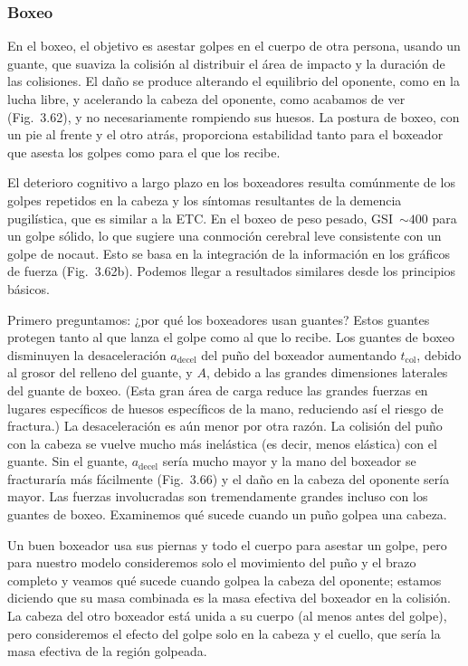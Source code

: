 \documentclass[12pt]{book}
\begin{document}
\subsubsection*{Boxeo}

En el boxeo, el objetivo es asestar golpes en el cuerpo de otra persona, usando un guante, que suaviza la colisión al distribuir el área de impacto y la duración de las colisiones. El daño se produce alterando el equilibrio del oponente, como en la lucha libre, y acelerando la cabeza del oponente, como acabamos de ver (Fig.~3.62), y no necesariamente rompiendo sus huesos. La postura de boxeo, con un pie al frente y el otro atrás, proporciona estabilidad tanto para el boxeador que asesta los golpes como para el que los recibe.

El deterioro cognitivo a largo plazo en los boxeadores resulta comúnmente de los golpes repetidos en la cabeza y los síntomas resultantes de la demencia pugilística, que es similar a la ETC. En el boxeo de peso pesado, GSI~$\sim 400$ para un golpe sólido, lo que sugiere una conmoción cerebral leve consistente con un golpe de nocaut. Esto se basa en la integración de la información en los gráficos de fuerza (Fig.~3.62b). Podemos llegar a resultados similares desde los principios básicos.

Primero preguntamos: ¿por qué los boxeadores usan guantes? Estos guantes protegen tanto al que lanza el golpe como al que lo recibe. Los guantes de boxeo disminuyen la desaceleración $a_{\text{decel}}$ del puño del boxeador aumentando $t_{\text{col}}$, debido al grosor del relleno del guante, y $A$, debido a las grandes dimensiones laterales del guante de boxeo. (Esta gran área de carga reduce las grandes fuerzas en lugares específicos de huesos específicos de la mano, reduciendo así el riesgo de fractura.) La desaceleración es aún menor por otra razón. La colisión del puño con la cabeza se vuelve mucho más inelástica (es decir, menos elástica) con el guante. Sin el guante, $a_{\text{decel}}$ sería mucho mayor y la mano del boxeador se fracturaría más fácilmente (Fig.~3.66) y el daño en la cabeza del oponente sería mayor. Las fuerzas involucradas son tremendamente grandes incluso con los guantes de boxeo. Examinemos qué sucede cuando un puño golpea una cabeza.

Un buen boxeador usa sus piernas y todo el cuerpo para asestar un golpe, pero para nuestro modelo consideremos solo el movimiento del puño y el brazo completo y veamos qué sucede cuando golpea la cabeza del oponente; estamos diciendo que su masa combinada es la masa efectiva del boxeador en la colisión. La cabeza del otro boxeador está unida a su cuerpo (al menos antes del golpe), pero consideremos el efecto del golpe solo en la cabeza y el cuello, que sería la masa efectiva de la región golpeada.
\end{document}

